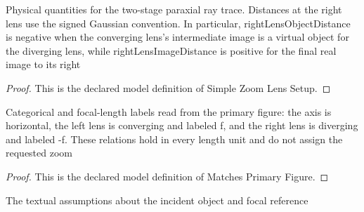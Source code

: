 \begin{definition}
  \label{def:physics:phyx-mini-0078:phyxminiproblems-problemphyxmini0078-simplezoomlenssetup}
  Physical quantities for the two-stage paraxial ray trace. Distances at the right lens use the signed Gaussian convention. In particular, rightLensObjectDistance is negative when the converging lens's intermediate image is a virtual object for the diverging lens, while rightLensImageDistance is positive for the final real image to its right
\end{definition}
\begin{proof}
  This is the declared model definition of Simple Zoom Lens Setup.
\end{proof}
\begin{definition}
  \label{def:physics:phyx-mini-0078:phyxminiproblems-problemphyxmini0078-matchesprimaryfigure}
  Categorical and focal-length labels read from the primary figure: the axis is horizontal, the left lens is converging and labeled f, and the right lens is diverging and labeled -f. These relations hold in every length unit and do not assign the requested zoom
\end{definition}
\begin{proof}
  This is the declared model definition of Matches Primary Figure.
\end{proof}
\begin{definition}
  \label{def:physics:phyx-mini-0078:phyxminiproblems-problemphyxmini0078-hasstatedobjectregimeandreference}
  The textual assumptions about the incident object and focal reference
\end{definition}
